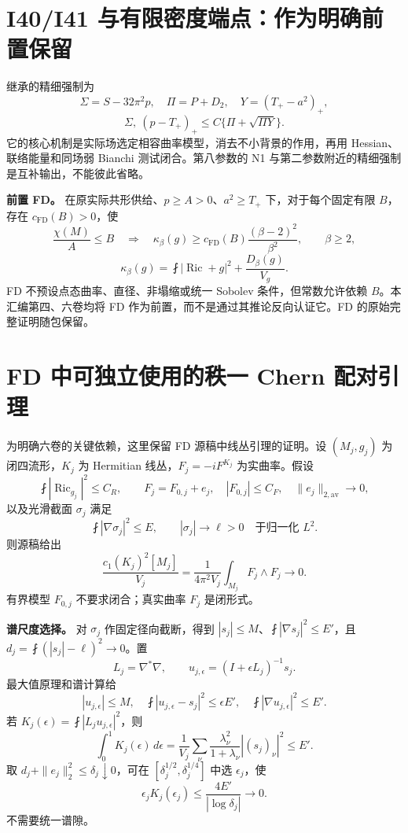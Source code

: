\documentclass[UTF8,11pt,fontset=none]{ctexart}
\theoremstyle{definition}
\theoremstyle{remark}
\begin{document}
\section{I40/I41 与有限密度端点：作为明确前置保留}\label{v1-i40i41-ux4e0eux6709ux9650ux5bc6ux5ea6ux7aefux70b9ux4f5cux4e3aux660eux786eux524dux7f6eux4fddux7559}

继承的精细强制为 \[
 \Sigma=S-32\pi^2p,\quad \Pi=P+D_2,\quad Y=(T_+-a^2)_+,
\] \[
 \boxed{\Sigma,\ (p-T_+)_+\le C\{\Pi+\sqrt{\Pi Y}\}.}
\tag{1.11}
\] 它的核心机制是实际场选定相容曲率模型，消去不小背景的作用，再用 Hessian、联络能量和同场弱 Bianchi 测试闭合。第八参数的 N1 与第二参数附近的精细强制是互补输出，不能彼此省略。\cite{I01,B01}

\textbf{前置 FD。} 在原实际共形供给、\(p\ge A>0\)、\(a^2\ge T_+\) 下，对于每个固定有限 \(B\)，存在 \(c_{\mathrm{FD}}(B)>0\)，使 \[
 \frac{\chi(M)}A\le B\quad\Longrightarrow\quad
 \boxed{\kappa_\beta(g)\ge c_{\mathrm{FD}}(B)
 \frac{(\beta-2)^2}{\beta^2}},\qquad\beta\ge2,
\tag{1.12}
\] \[
 \kappa_\beta(g)=\fint|\operatorname{Ric}+g|^2+\frac{D_\beta(g)}{V_g}.
\] FD 不预设点态曲率、直径、非塌缩或统一 Sobolev 条件，但常数允许依赖 \(B\)。本汇编第四、六卷均将 FD 作为前置，而不是通过其推论反向认证它。FD 的原始完整证明随包保留。\cite{I02}

\section{FD 中可独立使用的秩一 Chern 配对引理}\label{v1-fd-ux4e2dux53efux72ecux7acbux4f7fux7528ux7684ux79e9ux4e00-chern-ux914dux5bf9ux5f15ux7406}

为明确六卷的关键依赖，这里保留 FD 源稿中线丛引理的证明。设 \((M_j,g_j)\) 为闭四流形，\(K_j\) 为 Hermitian 线丛，\(F_j=-iF^{K_j}\) 为实曲率。假设 \[
 \fint|\operatorname{Ric}_{g_j}|^2\le C_R,\qquad
 F_j=F_{0,j}+e_j,\quad |F_{0,j}|\le C_F,\quad\|e_j\|_{2,\mathrm{av}}\to0,
\] 以及光滑截面 \(\sigma_j\) 满足 \[
 \fint|\nabla\sigma_j|^2\le E,
 \qquad |\sigma_j|\to\ell>0\quad\text{于归一化 }L^2.
\] 则源稿给出 \[
 \boxed{\frac{c_1(K_j)^2[M_j]}{V_j}
 =\frac1{4\pi^2V_j}\int_{M_j}F_j\wedge F_j\to0.}
\tag{1.13}
\] 有界模型 \(F_{0,j}\) 不要求闭合；真实曲率 \(F_j\) 是闭形式。

\textbf{谱尺度选择。} 对 \(\sigma_j\) 作固定径向截断，得到 \(|s_j|\le M\)、\(\fint|\nabla s_j|^2\le E'\)，且 \(d_j=\fint(|s_j|-\ell)^2\to0\)。置 \[
 L_j=\nabla^*\nabla,\qquad u_{j,\epsilon}=(I+\epsilon L_j)^{-1}s_j.
\] 最大值原理和谱计算给 \[
 |u_{j,\epsilon}|\le M,\quad
 \fint|u_{j,\epsilon}-s_j|^2\le\epsilon E',\quad
 \fint|\nabla u_{j,\epsilon}|^2\le E'.
\] 若 \(K_j(\epsilon)=\fint|L_ju_{j,\epsilon}|^2\)，则 \[
 \int_0^1K_j(\epsilon)\,d\epsilon
 =\frac1{V_j}\sum_\nu\frac{\lambda_\nu^2}{1+\lambda_\nu}|(s_j)_\nu|^2\le E'.
\] 取 \(d_j+\|e_j\|_2^2\le\delta_j\downarrow0\)，可在 \([\delta_j^{1/2},\delta_j^{1/4}]\) 中选 \(\epsilon_j\)，使 \[
 \epsilon_jK_j(\epsilon_j)\le\frac{4E'}{|\log\delta_j|}\to0.
\tag{1.14}
\] 不需要统一谱隙。
\end{document}
